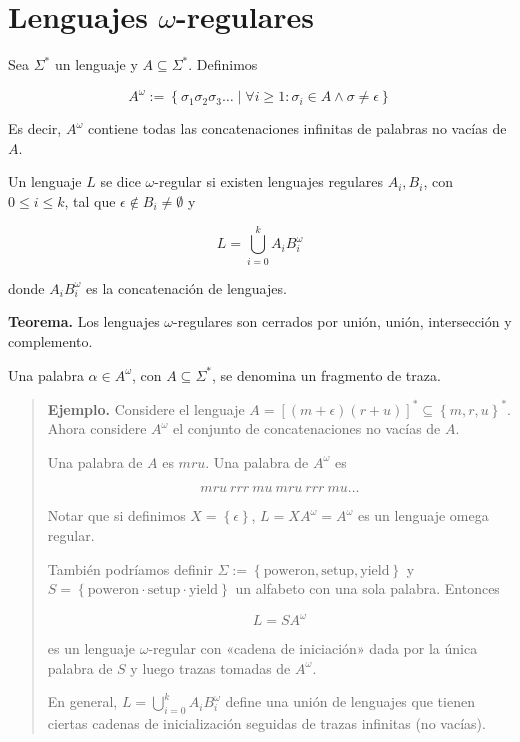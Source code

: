 \documentclass[a4paper, 12pt]{article}
\begin{document}
\section*{Lenguajes $\omega$-regulares}

Sea $\Sigma^*$ un lenguaje y $A \subseteq \Sigma^*$. Definimos 

\begin{equation}
    A^\omega := \left\{ \sigma_1\sigma_2\sigma_3 \ldots \mid \forall i \geq 1:
    \sigma_i \in A \land \sigma \neq \epsilon\right\} 
\end{equation}

Es decir, $A^\omega$ contiene todas las concatenaciones infinitas de palabras no
vacías de
$A$. 

Un lenguaje $L$ se dice $\omega$-regular si existen lenguajes regulares $A_i,
B_i$, con $0 \leq i \leq k$, tal que $\epsilon \not\in B_i \neq \emptyset$ y 

\begin{equation*}
    L = \bigcup_{i=0}^k A_i B_i^\omega
\end{equation*}

donde $A_i B_i^\omega$ es la concatenación de lenguajes.

\textbf{Teorema.} Los lenguajes $\omega$-regulares son cerrados por unión,
unión, intersección y complemento.

Una palabra $\alpha \in A^\omega$, con $A \subseteq \Sigma^*$, se denomina un
fragmento de traza.


\small
\begin{quote}

\textbf{Ejemplo.} Considere el lenguaje $A = \left[ (m + \epsilon)(r+u)
\right]^* \subseteq \left\{ m, r, u \right\}^* $. Ahora considere
$A^\omega$ el conjunto de concatenaciones no vacías de $A$.

Una palabra de $A$ es $mru$. Una palabra de $A^\omega$ es 

$$mru ~ rrr ~ mu ~ mru ~ rrr ~ mu \ldots$$

Notar que si definimos $X = \left\{ \epsilon \right\} $, $L = XA^\omega =
A^\omega$ es un lenguaje omega regular. 

También podríamos definir $\Sigma := \left\{ \text{poweron}, \text{setup},
\text{yield} \right\} $ y $S = \left\{ \text{poweron} \cdot \text{setup} \cdot
\text{yield} \right\} $ un alfabeto con una sola palabra. Entonces 

\begin{equation*}
    L = SA^\omega 
\end{equation*}

es un lenguaje $\omega$-regular con «cadena de iniciación» dada por la única
palabra de $S$ y luego trazas tomadas de $A^\omega$.

En general, $L = \bigcup_{i=0}^k A_iB_i^\omega$ define una unión de lenguajes
que tienen ciertas cadenas de inicialización seguidas de trazas infinitas (no
vacías).


\end{quote}
\normalsize
\end{document}
